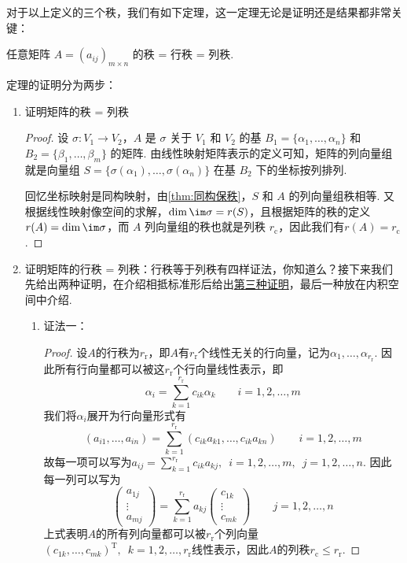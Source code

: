 对于以上定义的三个秩，我们有如下定理，这一定理无论是证明还是结果都非常关键：
\begin{theorem}{}{}
    任意矩阵 $A = (a_{ij})_{m\times n}$ 的秩 = 行秩 = 列秩.
\end{theorem}
定理的证明分为两步：
\begin{enumerate}
    \item 证明矩阵的秩 = 列秩

          \begin{proof}
            设 $\sigma : V_1 \to V_2$，$A$ 是 $\sigma$ 关于 $V_1$ 和 $V_2$ 的基 $B_1 = \{\alpha_1,\ldots,\alpha_n\}$ 和 $B_2 = \{\beta_1,\ldots,\beta_m\}$ 的矩阵. 由线性映射矩阵表示的定义可知，矩阵的列向量组就是向量组 $S = \{\sigma(\alpha_1),\ldots,\sigma(\alpha_n)\}$ 在基 $B_2$ 下的坐标按列排列.

            回忆坐标映射是同构映射，由\autoref{thm:同构保秩}，$S$ 和 $A$ 的列向量组秩相等. 又根据线性映射像空间的求解，$\dim\im\sigma = r(S)$，且根据矩阵的秩的定义 $r(A) = \dim\im\sigma$，而 $A$ 列向量组的秩也就是列秩 $r_\mathrm{c}$，因此我们有$r(A) = r_\mathrm{c}$.
          \end{proof}

    \item 证明矩阵的行秩 = 列秩：行秩等于列秩有四样证法，你知道么？接下来我们先给出两种证明，在介绍相抵标准形后给出\hyperref[pf:11:矩阵行秩=列秩]{第三种证明}，最后一种放在内积空间中介绍.
          \begin{enumerate}
              \item 证法一：
                    \begin{proof}
                        设$A$的行秩为$r_{\mathrm{r}}$，即$A$有$r_{\mathrm{r}}$个线性无关的行向量，记为$\alpha_1,\ldots,\alpha_{r_{\mathrm{r}}}$. 因此所有行向量都可以被这$r_{\mathrm{r}}$个行向量线性表示，即
                        \[\alpha_i=\sum_{k=1}^{r_{\mathrm{r}}}c_{ik}\alpha_k \qquad i=1,2,\ldots,m\]
                        我们将$\alpha_i$展开为行向量形式有
                        \[(a_{i1},\ldots,a_{in})=\sum_{k=1}^{r_{\mathrm{r}}}(c_{ik}a_{k1},\ldots,c_{ik}a_{kn}) \qquad i=1,2,\ldots,m\]
                        故每一项可以写为$a_{ij}=\displaystyle\sum_{k=1}^{r_{\mathrm{r}}}c_{ik}a_{kj},\enspace i=1,2,\ldots,m,\enspace j=1,2,\ldots,n$. 因此每一列可以写为
                        \[\begin{pmatrix}
                                a_{1j} \\ \vdots \\ a_{mj}
                            \end{pmatrix}=\sum_{k=1}^{r_{\mathrm{r}}}a_{kj}\begin{pmatrix}
                                c_{1k} \\ \vdots \\ c_{mk}
                            \end{pmatrix} \qquad j=1,2,\ldots,n\]
                        上式表明$A$的所有列向量都可以被$r_{\mathrm{r}}$个列向量$(c_{1k},\ldots,c_{mk})^\mathrm{T},\enspace k=1,2,\ldots,r_{\mathrm{r}}$线性表示，因此$A$的列秩$r_{\mathrm{c}}\leqslant r_{\mathrm{r}}$.


\end{proof}
\end{enumerate}
\end{enumerate}
